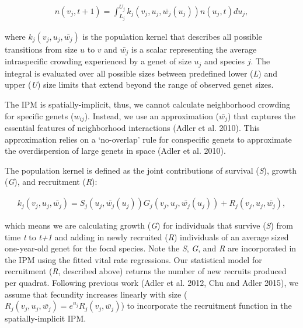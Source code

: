 \documentclass[12pt,]{article}
\begin{document}
\vspace{-3em}\begin{align}
n(v_{j},t+1) = \int_{L_{j}}^{U_{j}} k_{j}(v_{j},u_{j},\bar{w_{j}}(u_{j}))n(u_{j},t)du_{j},
\end{align}\vspace{-3em}

where \(k_{j}(v_{j},u_{j},\bar{w_{j}})\) is the population kernel that
describes all possible transitions from size \(u\) to \(v\) and
\(\bar{w_{j}}\) is a scalar representing the average intraspecific
crowding experienced by a genet of size \(u_j\) and species \(j\). The
integral is evaluated over all possible sizes between predefined lower
(\emph{L}) and upper (\emph{U}) size limits that extend beyond the range
of observed genet sizes.

The IPM is spatially-implicit, thus, we cannot calculate neighborhood
crowding for specific genets (\(w_{ij}\)). Instead, we use an
approximation (\(\bar{w_{j}}\)) that captures the essential features of
neighborhood interactions (Adler et al. 2010). This approximation relies
on a `no-overlap' rule for conspecific genets to approximate the
overdispersion of large genets in space (Adler et al. 2010).

The population kernel is defined as the joint contributions of survival
(\emph{S}), growth (\emph{G}), and recruitment (\emph{R}):

\vspace{-3em}\begin{align}
k_{j}(v_{j},u_{j},\bar{w_{j}}) = S_j(u_j, \bar{w_{j}}(u_{j}))G_j(v_{j},u_{j},\bar{w_{j}}(u_{j})) + R_j(v_{j},u_{j},\bar{w_{j}}),
\end{align}\vspace{-3em}

which means we are calculating growth (\emph{G}) for individuals that
survive (\emph{S}) from time \emph{t} to \emph{t+1} and adding in newly
recruited (\emph{R}) individuals of an average sized one-year-old genet
for the focal species. Note the \emph{S}, \emph{G}, and \emph{R} are
incorporated in the IPM using the fitted vital rate regressions. Our
statistical model for recruitment (\emph{R}, described above) returns
the number of new recruits produced per quadrat. Following previous work
(Adler et al. 2012, Chu and Adler 2015), we assume that fecundity
increases linearly with size
(\(R_j(v_{j},u_{j},\bar{w_{j}}) = e^{u_j}R_j(v_{j},\bar{w_{j}})\)) to
incorporate the recruitment function in the spatially-implicit IPM.
\end{document}
